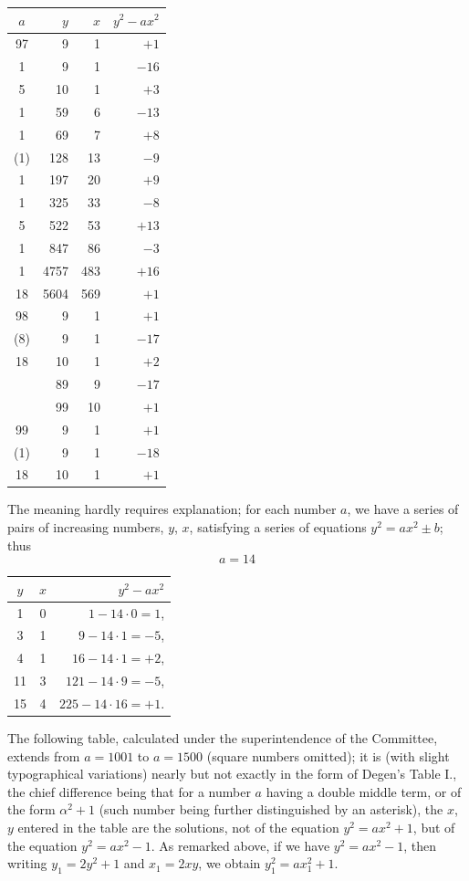 \documentclass[11pt]{article}
\begin{document}
\begin{center}
\renewcommand{\arraystretch}{1.05}
\begin{tabular}{|c|r|r|r|}
\hline
$a$ & $y$ & $x$ & $y^2 - ax^2$ \\
\hline
97 & 9 & 1 & $+1$ \\
1 & 9 & 1 & $-16$ \\
5 & 10 & 1 & $+3$ \\
1 & 59 & 6 & $-13$ \\
1 & 69 & 7 & $+8$ \\
(1) & 128 & 13 & $-9$ \\
1 & 197 & 20 & $+9$ \\
1 & 325 & 33 & $-8$ \\
5 & 522 & 53 & $+13$ \\
1 & 847 & 86 & $-3$ \\
1 & 4757 & 483 & $+16$ \\
18 & 5604 & 569 & $+1$ \\
\hline
98 & 9 & 1 & $+1$ \\
(8) & 9 & 1 & $-17$ \\
18 & 10 & 1 & $+2$ \\
 & 89 & 9 & $-17$ \\
 & 99 & 10 & $+1$ \\
\hline
99 & 9 & 1 & $+1$ \\
(1) & 9 & 1 & $-18$ \\
18 & 10 & 1 & $+1$ \\
\hline
\end{tabular}
\end{center}

The meaning hardly requires explanation; for each number $a$, we have a series of pairs of increasing numbers, $y$, $x$, satisfying a series of equations $y^2 = ax^2 \pm b$; thus
\[
a = 14
\]
\begin{center}
\begin{tabular}{ccr}
$y$ & $x$ & $y^2 - ax^2$ \\
\hline
1 & 0 & $1 - 14 \cdot 0 = 1$, \\
3 & 1 & $9 - 14 \cdot 1 = -5$, \\
4 & 1 & $16 - 14 \cdot 1 = +2$, \\
11 & 3 & $121 - 14 \cdot 9 = -5$, \\
15 & 4 & $225 - 14 \cdot 16 = +1$. \\
\end{tabular}
\end{center}

The following table, calculated under the superintendence of the Committee, extends from $a = 1001$ to $a = 1500$ (square numbers omitted); it is (with slight typographical variations) nearly but not exactly in the form of Degen's Table I., the chief difference being that for a number $a$ having a double middle term, or of the form $\alpha^2 + 1$ (such number being further distinguished by an asterisk), the $x$, $y$ entered in the table are the solutions, not of the equation $y^2 = ax^2 + 1$, but of the equation $y^2 = ax^2 - 1$. As remarked above, if we have $y^2 = ax^2 - 1$, then writing $y_1 = 2y^2 + 1$ and $x_1 = 2xy$, we obtain $y_1^2 = ax_1^2 + 1$.
\end{document}
